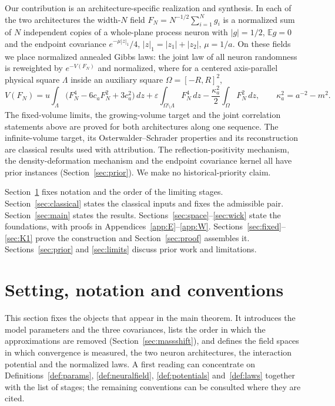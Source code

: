 \documentclass[11pt]{article}
\theoremstyle{plain}
\theoremstyle{definition}
\theoremstyle{remark}
\newcommand{\E}{\mathbb{E}}
\begin{document}
Our contribution is an architecture-specific realization and synthesis. In each
of the two architectures the width-$N$ field
$F_N=N^{-1/2}\sum_{i=1}^{N}g_i$ is a normalized sum of $N$ independent copies of a
whole-plane process neuron with $|g|=1/2$, $\E g=0$ and the endpoint covariance
$e^{-\mu|z|_1}/4$, $|z|_1=|z_1|+|z_2|$, $\mu=1/a$. On these fields we place
normalized annealed Gibbs laws: the joint law of all neuron randomness is
reweighted by $e^{-V(F_N)}$ and normalized, where for a centered axis-parallel
physical square $\Lambda$ inside an auxiliary square $\Omega=[-R,R]^{2}$,
\[
V(F_N)=u\int_{\Lambda}\bigl(F_N^{4}-6c_aF_N^{2}+3c_a^{2}\bigr)\,dz
+\varepsilon\int_{\Omega\setminus\Lambda}F_N^{4}\,dz
-\frac{\kappa_a^{2}}{2}\int_{\Omega}F_N^{2}\,dz,\qquad \kappa_a^{2}=a^{-2}-m^{2}.
\]
The fixed-volume limits, the growing-volume target and the joint correlation
statements above are proved for both architectures along one sequence. The
infinite-volume target, its Osterwalder--Schrader properties and its
reconstruction are classical results used with attribution. The
reflection-positivity mechanism, the density-deformation mechanism and the
endpoint covariance kernel all have prior instances (Section~\ref{sec:prior}).
We make no historical-priority claim.

Section~\ref{sec:setting} fixes notation and the order of the limiting stages.
Section~\ref{sec:classical} states the classical inputs and fixes the admissible
pair. Section~\ref{sec:main} states the results. Sections~\ref{sec:space}--\ref{sec:wick}
state the foundations, with proofs in Appendices~\ref{app:E}--\ref{app:W}.
Sections~\ref{sec:fixed}--\ref{sec:K1} prove the construction and
Section~\ref{sec:proof} assembles it. Sections~\ref{sec:prior} and
\ref{sec:limits} discuss prior work and limitations.

\section{Setting, notation and conventions}\label{sec:setting}

This section fixes the objects that appear in the main theorem. It introduces the model parameters and the three covariances, lists the order in which the approximations are removed (Section~\ref{sec:massshift}), and defines the field spaces in which convergence is measured, the two neuron architectures, the interaction potential and the normalized laws. A first reading can concentrate on Definitions~\ref{def:params}, \ref{def:neuralfield}, \ref{def:potentials} and~\ref{def:laws} together with the list of stages; the remaining conventions can be consulted where they are cited.
\end{document}
